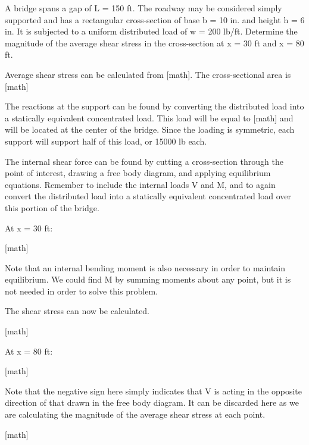 \documentclass[
  letterpaper,
  DIV=11,
  numbers=noendperiod]{scrreprt}
\begin{document}
\begin{tcolorbox}[enhanced jigsaw, colbacktitle=quarto-callout-note-color!10!white, title={Example 2.3: Simple shear stress}, coltitle=black, leftrule=.75mm, rightrule=.15mm, opacityback=0, breakable, colframe=quarto-callout-note-color-frame, left=2mm, arc=.35mm, colback=white, bottomrule=.15mm, bottomtitle=1mm, toptitle=1mm, titlerule=0mm, opacitybacktitle=0.6, toprule=.15mm]

A bridge spans a gap of L = 150 ft. The roadway may be considered simply
supported and has a rectangular cross-section of base b = 10 in. and
height h = 6 in. It is subjected to a uniform distributed load of w =
200 lb/ft. Determine the magnitude of the average shear stress in the
cross-section at x = 30 ft and x = 80 ft.

\begin{tcolorbox}[enhanced jigsaw, colbacktitle=quarto-callout-note-color!10!white, title={Solution}, coltitle=black, leftrule=.75mm, rightrule=.15mm, opacityback=0, breakable, colframe=quarto-callout-note-color-frame, left=2mm, arc=.35mm, colback=white, bottomrule=.15mm, bottomtitle=1mm, toptitle=1mm, titlerule=0mm, opacitybacktitle=0.6, toprule=.15mm]

Average shear stress can be calculated from {[}math{]}. The
cross-sectional area is {[}math{]}

The reactions at the support can be found by converting the distributed
load into a statically equivalent concentrated load. This load will be
equal to {[}math{]} and will be located at the center of the bridge.
Since the loading is symmetric, each support will support half of this
load, or 15000 lb each.

The internal shear force can be found by cutting a cross-section through
the point of interest, drawing a free body diagram, and applying
equilibrium equations. Remember to include the internal loads V and M,
and to again convert the distributed load into a statically equivalent
concentrated load over this portion of the bridge.

At x = 30 ft:

{[}math{]}

Note that an internal bending moment is also necessary in order to
maintain equilibrium. We could find M by summing moments about any
point, but it is not needed in order to solve this problem.

The shear stress can now be calculated.

{[}math{]}

At x = 80 ft:

{[}math{]}

Note that the negative sign here simply indicates that V is acting in
the opposite direction of that drawn in the free body diagram. It can be
discarded here as we are calculating the magnitude of the average shear
stress at each point.

{[}math{]}

\end{tcolorbox}

\end{tcolorbox}
\end{document}
